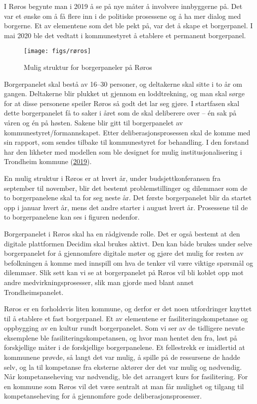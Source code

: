 \documentclass[
  12pt,
  a4paper, 12pt]{article}
\begin{document}
I Røros begynte man i 2019 å se på nye måter å involvere innbyggerne på. Det var et ønske om å få flere inn i de politiske prosessene og å ha mer dialog med borgerne. Et av elementene som det ble pekt på, var det å skape et borgerpanel. I mai 2020 ble det vedtatt i kommunestyret å etablere et permanent borgerpanel.

\begin{figure}

{\centering \texttt{[image: figs/røros]} 

}

\caption{Mulig struktur for borgerpaneler på Røros}\label{fig:unnamed-chunk-5}
\end{figure}

Borgerpanelet skal bestå av 16--30 personer, og deltakerne skal sitte i to år om gangen. Deltakerne blir plukket ut gjennom en loddtrekning, og man skal sørge for at disse personene speiler Røros så godt det lar seg gjøre. I startfasen skal dette borgerpanelet få to saker i året som de skal deliberere over -- én sak på våren og én på høsten. Sakene blir gitt til borgerpanelet av kommunestyret/formannskapet. Etter deliberasjonsprosessen skal de komme med sin rapport, som sendes tilbake til kommunestyret for behandling. I den forstand har den likheter med modellen som ble designet for mulig institusjonalisering i Trondheim kommune (\protect\hyperlink{ref-trondheim_kommune_den_2019}{2019}).

En mulig struktur i Røros er at hvert år, under budsjettkonferansen fra september til november, blir det bestemt problemstillinger og dilemmaer som de to borgerpanelene skal ta for seg neste år. Det første borgerpanelet blir da startet opp i januar hvert år, mens det andre starter i august hvert år. Prosessene til de to borgerpanelene kan ses i figuren nedenfor.

Borgerpanelet i Røros skal ha en rådgivende rolle. Det er også bestemt at den digitale plattformen Decidim skal brukes aktivt. Den kan både brukes under selve borgerpanelet for å gjennomføre digitale møter og gjøre det mulig for resten av befolkningen å komme med innspill om hva de tenker vil være viktige spørsmål og dilemmaer. Slik sett kan vi se at borgerpanelet på Røros vil bli koblet opp mot andre medvirkningsprosesser, slik man gjorde med blant annet Trondheimspanelet.

Røros er en forholdsvis liten kommune, og derfor er det noen utfordringer knyttet til å etablere et fast borgerpanel. Et av elementene er fasiliteringskompetanse og oppbygging av en kultur rundt borgerpanelet. Som vi ser av de tidligere nevnte eksemplene ble fasiliteringskompetansen, og hvor man hentet den fra, løst på forskjellige måter i de forskjellige borgerpanelene. Et fellestrekk er imidlertid at kommunene prøvde, så langt det var mulig, å spille på de ressursene de hadde selv, og la til kompetanse fra eksterne aktører der det var mulig og nødvendig. Når kompetanseheving var nødvendig, ble det arrangert kurs for fasilitering. For en kommune som Røros vil det være sentralt at man får mulighet og tilgang til kompetanseheving for å gjennomføre gode deliberasjonsprosesser.
\end{document}
